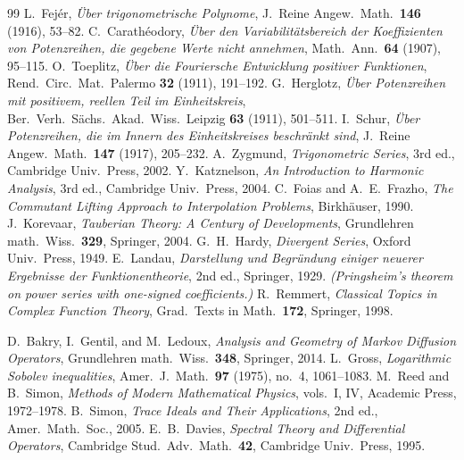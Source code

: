 \documentclass[11pt]{amsart}
\theoremstyle{definition}
\theoremstyle{remark}
\theoremstyle{definition}
\begin{document}
\begin{thebibliography}{99}
 L.~Fej\'er, \emph{\"Uber trigonometrische Polynome}, J.\ Reine Angew.\ Math.\
\textbf{146} (1916), 53--82.
 C.~Carath\'eodory, \emph{\"Uber den Variabilit\"atsbereich der Koeffizienten
von Potenzreihen, die gegebene Werte nicht annehmen}, Math.\ Ann.\ \textbf{64} (1907), 95--115.
\bibitem{Toeplitz} O.~Toeplitz, \emph{\"Uber die Fouriersche Entwicklung positiver Funktionen},
Rend.\ Circ.\ Mat.\ Palermo \textbf{32} (1911), 191--192.
 G.~Herglotz, \emph{\"Uber Potenzreihen mit positivem, reellen Teil im
Einheitskreis}, Ber.\ Verh.\ S\"achs.\ Akad.\ Wiss.\ Leipzig \textbf{63} (1911), 501--511.
\bibitem{Schur} I.~Schur, \emph{\"Uber Potenzreihen, die im Innern des Einheitskreises beschr\"ankt
sind}, J.\ Reine Angew.\ Math.\ \textbf{147} (1917), 205--232.
 A.~Zygmund, \emph{Trigonometric Series}, 3rd ed., Cambridge Univ.\ Press, 2002.
\bibitem{Katznelson} Y.~Katznelson, \emph{An Introduction to Harmonic Analysis}, 3rd ed., Cambridge
Univ.\ Press, 2004.
 C.~Foias and A.~E.~Frazho, \emph{The Commutant Lifting Approach to
Interpolation Problems}, Birkh\"auser, 1990.
 J.~Korevaar, \emph{Tauberian Theory: A Century of Developments}, Grundlehren
math.\ Wiss.\ \textbf{329}, Springer, 2004.
 G.~H.~Hardy, \emph{Divergent Series}, Oxford Univ.\ Press, 1949.
\bibitem{Landau} E.~Landau, \emph{Darstellung und Begr\"undung einiger neuerer Ergebnisse der
Funktionentheorie}, 2nd ed., Springer, 1929. \emph{(Pringsheim's theorem on power series with
one-signed coefficients.)}
 R.~Remmert, \emph{Classical Topics in Complex Function Theory}, Grad.\ Texts in
Math.\ \textbf{172}, Springer, 1998.

 D.~Bakry, I.~Gentil, and M.~Ledoux, \emph{Analysis and Geometry of Markov Diffusion
Operators}, Grundlehren math.\ Wiss.\ \textbf{348}, Springer, 2014.
\bibitem{Gross} L.~Gross, \emph{Logarithmic Sobolev inequalities}, Amer.\ J.\ Math.\ \textbf{97}
(1975), no.~4, 1061--1083.
 M.~Reed and B.~Simon, \emph{Methods of Modern Mathematical Physics}, vols.~I,
IV, Academic Press, 1972--1978.
 B.~Simon, \emph{Trace Ideals and Their Applications}, 2nd ed., Amer.\ Math.\ Soc.,
2005.
 E.~B.~Davies, \emph{Spectral Theory and Differential Operators}, Cambridge Stud.\
Adv.\ Math.\ \textbf{42}, Cambridge Univ.\ Press, 1995.


\end{thebibliography}
\end{document}

